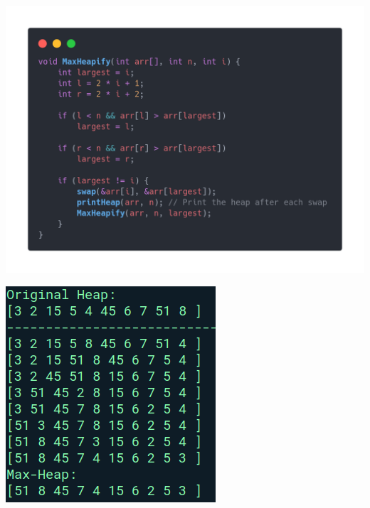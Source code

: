 \documentclass[12pt,openany]{book}
\theoremstyle{definition}
\begin{document}
	\begin{center}
		\begin{minipage}{.65\textwidth}
			\includegraphics[width=\textwidth]{MaxHeapify.png}
		\end{minipage}
	\begin{minipage}{.325\textwidth}
		\includegraphics[width=\textwidth]{MaxHeapify_print.png}
\end{minipage}
	\end{center}
\end{document}
